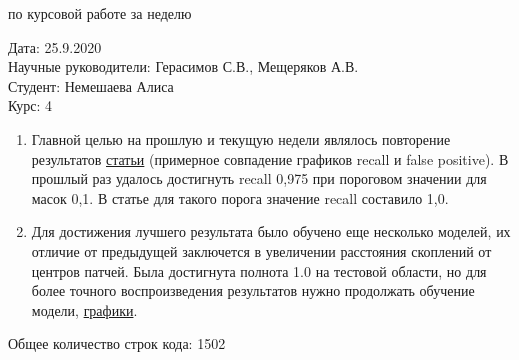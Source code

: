 \documentclass{article}
\begin{document}
\begin{center}{ по курсовой работе за неделю\\}\end{center}
Дата: 25.9.2020\\
Научные руководители: Герасимов С.В., Мещеряков А.В.\\
Студент: Немешаева Алиса\\
Курс: 4\\

\renewcommand{\labelitemi}{$\blacksquare$}
\renewcommand\labelitemii{$\square$}
\begin{enumerate}
    \item Главной целью на прошлую и текущую недели являлось повторение результатов \hyperlink{https://www.aanda.org/articles/aa/pdf/2020/02/aa36919-19.pdf}{статьи}
            (примерное совпадение графиков recall и false positive). В прошлый раз удалось достигнуть 
            recall 0,975 при пороговом значении для масок 0,1. В статье для такого порога значение 
            recall составило 1,0.\\
    \item Для достижения лучшего результата было обучено еще несколько моделей, их отличие от 
        предыдущей заключется в увеличении расстояния скоплений от центров патчей. Была достигнута 
        полнота 1.0 на тестовой области, но для более точного воспроизведения результатов нужно 
        продолжать обучение модели,
        \hyperlink{https://github.com/rt2122/data-segmentation-2/blob/master/Planck\_Unet/scan\_planck\_z\_f8\_d0.8.ipynb}{графики}.\\
\end{enumerate}

Общее количество строк кода: 1502\\
\end{document}
